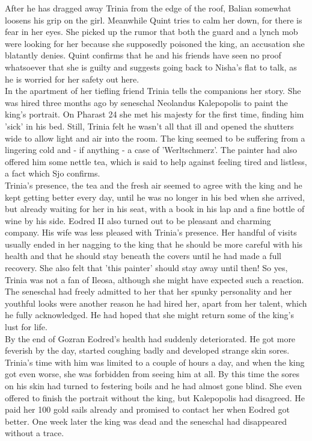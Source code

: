 After he has dragged away Trinia from the edge of the roof, Balian somewhat loosens his grip on the girl. Meanwhile Quint tries to calm her down, for there is fear in her eyes. She picked up the rumor that both the guard and a lynch mob were looking for her because she supposedly poisoned the king, an accusation she blatantly denies. Quint confirms that he and his friends have seen no proof whatsoever that she is guilty and suggests going back to Nisha's flat to talk, as he is worried for her safety out here.\\

In the apartment of her tiefling friend Trinia tells the companions her story. She was hired three months ago by seneschal Neolandus Kalepopolis to paint the king's portrait. On Pharast 24 she met his majesty for the first time, finding him 'sick' in his bed. Still, Trinia felt he wasn't all that ill and opened the shutters wide to allow light and air into the room. The king seemed to be suffering from a lingering cold and - if anything - a case of 'Werltschmerz'. The painter had also offered him some nettle tea, which is said to help against feeling tired and listless, a fact which Sjo confirms.\\

Trinia's presence, the tea and the fresh air seemed to agree with the king and he kept getting better every day, until he was no longer in his bed when she arrived, but already waiting for her in his seat, with a book in his lap and a fine bottle of wine by his side. Eodred II also turned out to be pleasant and charming company. His wife was less pleased with Trinia's presence. Her handful of visits usually ended in her nagging to the king that he should be more careful with his health and that he should stay beneath the covers until he had made a full recovery. She also felt that 'this painter' should stay away until then! So yes, Trinia was not a fan of Ileosa, although she might have expected such a reaction. The seneschal had freely admitted to her that her spunky personality and her youthful looks were another reason he had hired her, apart from her talent, which he fully acknowledged. He had hoped that she might return some of the king's lust for life.\\

By the end of Gozran Eodred's health had suddenly deteriorated. He got more feverish by the day, started coughing badly and developed strange skin sores. Trinia's time with him was limited to a couple of hours a day, and when the king got even worse, she was forbidden from seeing him at all. By this time the sores on his skin had turned to festering boils and he had almost gone blind. She even offered to finish the portrait without the king, but Kalepopolis had disagreed. He paid her 100 gold sails already and promised to contact her when Eodred got better. One week later the king was dead and the seneschal had disappeared without a trace.\\

